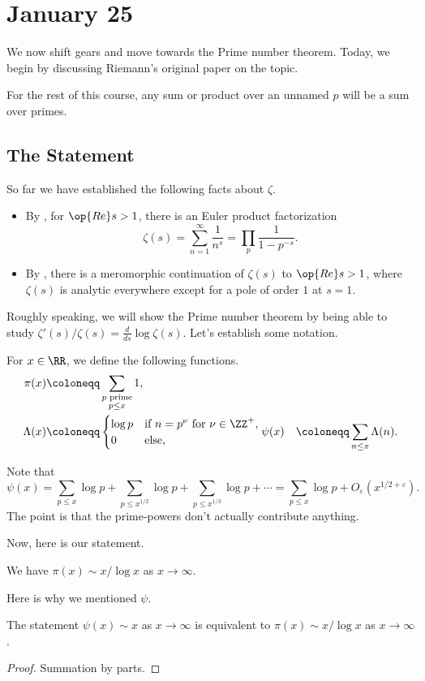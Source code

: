 \documentclass[../notes.tex]{subfiles}
\begin{document}
\section{January 25}

We now shift gears and move towards the Prime number theorem. Today, we begin by discussing Riemann's original paper on the topic.
\begin{remark}
	For the rest of this course, any sum or product over an unnamed $p$ will be a sum over primes.
\end{remark}

\subsection{The Statement}
So far we have established the following facts about $\zeta$.
\begin{itemize}
	\item By , for $\op{Re}s>1$, there is an Euler product factorization
	\[\zeta(s)=\sum_{n=1}^\infty\frac1{n^s}=\prod_p\frac1{1-p^{-s}}.\]
	\item By , there is a meromorphic continuation of $\zeta(s)$ to $\op{Re}s>1$, where $\zeta(s)$ is analytic everywhere except for a pole of order $1$ at $s=1$.
\end{itemize}
Roughly speaking, we will show the Prime number theorem by being able to study $\zeta'(s)/\zeta(s)=\frac d{ds}\log\zeta(s)$. Let's establish some notation.
\begin{definition}
	For $x\in\RR$, we define the following functions.
	\begin{align*}
		\pi(x) &\coloneqq \sum_{\substack{p\text{ prime}\\p\le x}}1, \\
		\Lambda(x) &\coloneqq\begin{cases}
			\log p & \text{if }n=p^\nu\text{ for }\nu\in\ZZ^+, \\
			0 & \text{else},
		\end{cases}
		\psi(x) &\coloneqq \sum_{n\le x}\Lambda(n).
	\end{align*}
\end{definition}
\begin{remark}
	Note that
	\[\psi(x)=\sum_{p\le x}\log p+\sum_{p\le x^{1/2}}\log p+\sum_{p\le x^{1/3}}\log p+\cdots=\sum_{p\le x}\log p+O_\varepsilon\left(x^{1/2+\varepsilon}\right).\]
	The point is that the prime-powers don't actually contribute anything.
\end{remark}
Now, here is our statement.
\begin{theorem}
	We have $\pi(x)\sim x/\log x$ as $x\to\infty$.
\end{theorem}
Here is why we mentioned $\psi$.
\begin{proposition}
	The statement $\psi(x)\sim x$ as $x\to\infty$ is equivalent to $\pi(x)\sim x/\log x$ as $x\to\infty$.
\end{proposition}
\begin{proof}
	Summation by parts.
\end{proof}
\end{document}
